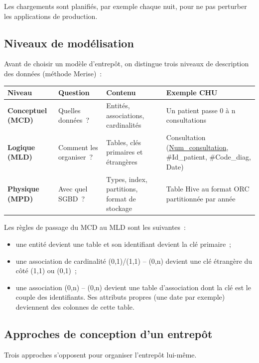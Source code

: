 \noindent Les chargements sont planifiés, par exemple chaque nuit, pour ne pas perturber les applications de production.

\subsection{Niveaux de modélisation}

\noindent Avant de choisir un modèle d'entrepôt, on distingue trois niveaux de description des données (méthode Merise)~:

\begin{center}
\begin{tabularx}{\textwidth}{>{\bfseries}l >{\raggedright\arraybackslash}X >{\raggedright\arraybackslash}X >{\raggedright\arraybackslash}X}
\toprule
Niveau & Question & Contenu & Exemple CHU \\
\midrule
Conceptuel (MCD) & Quelles données~? & Entités, associations, cardinalités & Un patient passe 0 à n consultations \\
Logique (MLD) & Comment les organiser~? & Tables, clés primaires et étrangères & Consultation (\underline{Num\_consul\-ta\-tion}, \#Id\_patient, \#Code\_diag, Date) \\
Physique (MPD) & Avec quel SGBD~? & Types, index, partitions, format de stockage & Table Hive au format ORC partitionnée par année \\
\bottomrule
\end{tabularx}
\end{center}

\noindent Les règles de passage du MCD au MLD sont les suivantes~:
\begin{itemize}
	\item une entité devient une table et son identifiant devient la clé primaire~;
	\item une association de cardinalité (0,1)/(1,1) -- (0,n) devient une clé étrangère du côté (1,1) ou (0,1)~;
	\item une association (0,n) -- (0,n) devient une table d'association dont la clé est le couple des identifiants. Ses attributs propres (une date par exemple) deviennent des colonnes de cette table.
\end{itemize}

\subsection{Approches de conception d'un entrepôt}

\noindent Trois approches s'opposent pour organiser l'entrepôt lui-même.

